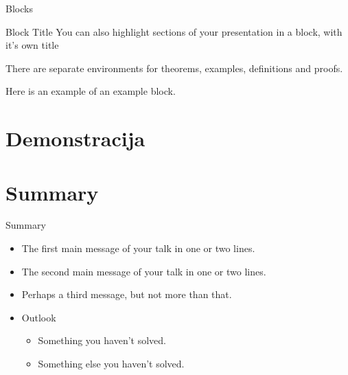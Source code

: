 \documentclass[utf8]{beamer}
\begin{document}
\begin{frame}{Blocks}
\begin{block}{Block Title}
You can also highlight sections of your presentation in a block, with it's own title
\end{block}
\begin{theorem}
There are separate environments for theorems, examples, definitions and proofs.
\end{theorem} 
\begin{example}
Here is an example of an example block.
\end{example}
\end{frame}

\section{Demonstracija}

\section*{Summary}

\begin{frame}{Summary}
  \begin{itemize}
  \item
    The \alert{first main message} of your talk in one or two lines.
  \item
    The \alert{second main message} of your talk in one or two lines.
  \item
    Perhaps a \alert{third message}, but not more than that.
  \end{itemize}
  
  \begin{itemize}
  \item
    Outlook
    \begin{itemize}
    \item
      Something you haven't solved.
    \item
      Something else you haven't solved.
    \end{itemize}
  \end{itemize}
\end{frame}
\end{document}
